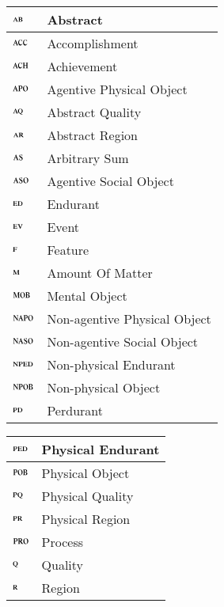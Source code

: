 \documentclass[ao]{iosart2x}
\newcommand{\dolce}{{\textsc{dolce}}}
\newcommand {\ABdcat} {\textsc{ab}}
\newcommand {\AQdcat} {\textsc{aq}}
\newcommand {\ARdcat} {\textsc{ar}}
\newcommand {\ACHdcat} {\textsc{ach}}
\newcommand {\ACCdcat} {\textsc{acc}}
\newcommand {\APOdcat} {\textsc{apo}}
\newcommand {\ASOdcat} {\textsc{aso}}
\newcommand {\Mdcat} {\textsc{m}}
\newcommand {\ASdcat} {\textsc{as}}
\newcommand {\EDdcat} {\textsc{ed}}
\newcommand {\EVdcat} {\textsc{ev}}
\newcommand {\Fdcat} {\textsc{f}}
\newcommand {\MOBdcat} {\textsc{mob}}
\newcommand {\NAPOdcat} {\textsc{napo}}
\newcommand {\NASOdcat} {\textsc{naso}}
\newcommand {\NPEDdcat} {\textsc{nped}}
\newcommand {\NPOBdcat} {\textsc{npob}}
\newcommand {\PDdcat} {\textsc{pd}}
\newcommand {\PEDdcat} {\textsc{ped}}
\newcommand {\POBdcat} {\textsc{pob}}
\newcommand {\PQdcat} {\textsc{pq}}
\newcommand {\PRdcat} {\textsc{pr}}
\newcommand {\PROdcat} {\textsc{pro}}
\newcommand {\Qdcat} {\textsc{q}}
\newcommand {\Rdcat} {\textsc{r}}
\begin{document}
\begin{table*}
\caption{Categories of {\dolce}.}\label{table_cat_dolce}
\begin{minipage}{0.45\textwidth}
\hspace{40pt}
\begin{tabular}{|p{}|p{}|}
\hline
$\ABdcat$ & Abstract \\
\hline
$\ACCdcat$ & Accomplishment \\
\hline
$\ACHdcat$ & Achievement \\
\hline
$\APOdcat$ & Agentive Physical Object \\
\hline
$\AQdcat$ & Abstract Quality\\
\hline
$\ARdcat$ & Abstract Region\\
\hline
$\ASdcat$ & Arbitrary Sum \\
\hline
$\ASOdcat$ & Agentive Social Object \\
\hline
$\EDdcat$ & Endurant \\
\hline
$\EVdcat$ & Event \\
\hline
$\Fdcat$ & Feature \\
\hline
$\Mdcat$ & Amount Of Matter \\
\hline
$\MOBdcat$ & Mental Object \\
\hline
$\NAPOdcat$ & Non-agentive Physical Object \\
\hline
$\NASOdcat$ & Non-agentive Social Object \\
\hline
$\NPEDdcat$ & Non-physical Endurant \\
\hline
$\NPOBdcat$ & Non-physical Object \\
\hline
$\PDdcat$ & Perdurant \\
\hline
\end{tabular}
\end{minipage}%
\mbox{}\hfill{}
\begin{minipage}{0.45\textwidth}
\hspace{-12pt}\begin{tabular}{|p{}|p{}|}
\hline
$\PEDdcat$ & Physical Endurant \\
\hline
$\POBdcat$ & Physical Object \\
\hline
$\PQdcat$ & Physical Quality\\
\hline
$\PRdcat$ & Physical Region\\
\hline
$\PROdcat$ & Process\\
\hline
$\Qdcat$ & Quality \\
\hline
$\Rdcat$ & Region \\

\end{tabular}
\end{minipage}
\end{table*}
\end{document}
